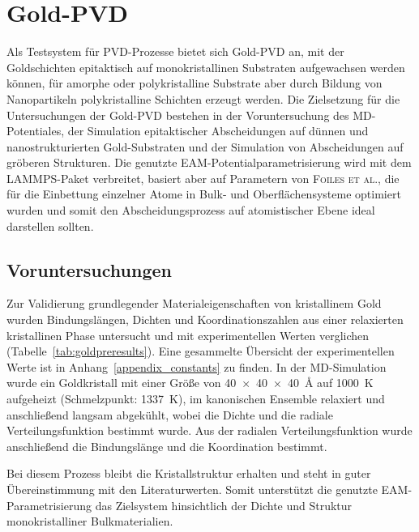 \section{Gold-PVD}
\label{goldpvd}

Als Testsystem für PVD-Prozesse bietet sich Gold-PVD an, mit der Goldschichten epitaktisch auf monokristallinen Substraten aufgewachsen werden können\cite{gottsche_uber_1956}, für amorphe oder polykristalline Substrate aber durch Bildung von Nanopartikeln polykristalline Schichten erzeugt werden\cite{svorcik_annealing_2011}.
Die Zielsetzung für die Untersuchungen der Gold-PVD bestehen in der Voruntersuchung des MD-Potentiales, der Simulation epitaktischer Abscheidungen auf dünnen und nanostrukturierten Gold-Substraten und der Simulation von Abscheidungen auf gröberen Strukturen.
Die genutzte EAM-Potentialparametrisierung wird mit dem LAMMPS-Paket\cite{plimpton_lammps_2014} verbreitet, basiert aber auf Parametern von \textsc{Foiles et al.}\cite{foiles_embedded-atom-method_1986}, die für die Einbettung einzelner Atome in Bulk- und Oberflächensysteme optimiert wurden und somit den Abscheidungsprozess auf atomistischer Ebene ideal darstellen sollten.

\subsection{Voruntersuchungen}
\label{goldpreparation}

Zur Validierung grundlegender Materialeigenschaften von kristallinem Gold wurden Bindungslängen, Dichten und Koordinationszahlen aus einer relaxierten kristallinen Phase untersucht und mit experimentellen Werten\cite{haynes_crc_2011} verglichen (Tabelle~\ref{tab:goldpreresults}).
Eine gesammelte Übersicht der experimentellen Werte ist in Anhang~\ref{appendix_constants} zu finden.
In der MD-Simulation wurde ein Goldkristall mit einer Größe von \SI{40x40x40}{\angstrom} auf \SI{1000}{\kelvin} aufgeheizt (Schmelzpunkt: \SI{1337}{\kelvin}), im kanonischen Ensemble relaxiert und anschließend langsam abgekühlt, wobei die Dichte und die radiale Verteilungsfunktion bestimmt wurde.
Aus der radialen Verteilungsfunktion wurde anschließend die Bindungslänge und die Koordination bestimmt.

Bei diesem Prozess bleibt die Kristallstruktur erhalten und steht in guter Übereinstimmung mit den Literaturwerten.
Somit unterstützt die genutzte EAM-Para\-metri\-sierung das Zielsystem hinsichtlich der Dichte und Struktur monokristalliner Bulkmaterialien.


